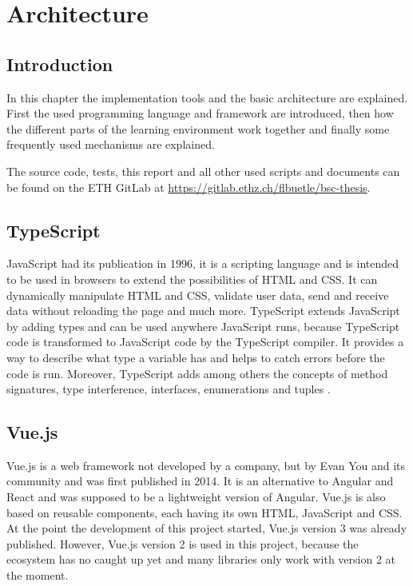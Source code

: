 \chapter{Architecture}
\label{chapter:architecture}

\section{Introduction}
\label{section:introduction}
In this chapter the implementation tools and the basic architecture are explained. First the used programming language and framework are introduced, then how the different parts of the learning environment work together and finally some frequently used mechanisms are explained.

The source code, tests, this report and all other used scripts and documents can be found on the ETH GitLab at \url{https://gitlab.ethz.ch/flbuetle/bsc-thesis}.

\section{TypeScript}
\label{section:typescript}
JavaScript had its publication in 1996, it is a scripting language and is intended to be used in browsers to extend the possibilities of HTML and CSS. It can dynamically manipulate HTML and CSS, validate user data, send and receive data without reloading the page and much more.
TypeScript extends JavaScript by adding types and can be used anywhere JavaScript runs, because TypeScript code is transformed to JavaScript code by the TypeScript compiler. It provides a way to describe what type a variable has and helps to catch errors before the code is run. Moreover, TypeScript adds among others the concepts of method signatures, type interference, interfaces, enumerations and tuples \cite{Typescript}.

\section{Vue.js}
\label{section:vuejs}
Vue.js is a web framework not developed by a company, but by Evan You and its community and was first published in 2014. It is an alternative to Angular and React and was supposed to be a lightweight version of Angular. Vue.js is also based on reusable components, each having its own HTML, JavaScript and CSS.
At the point the development of this project started, Vue.js version 3 was already published. However, Vue.js version 2 is used in this project, because the ecosystem has no caught up yet and many libraries only work with version 2 at the moment\cite{Vue}.

